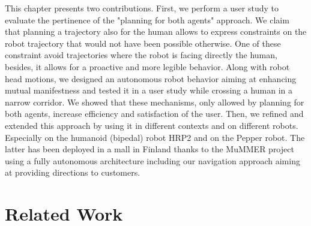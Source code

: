 \documentclass[a4paper,11pt,twoside]{StyleThese}
\begin{document}
This chapter presents two contributions. First, we perform a user study to evaluate the pertinence of the "planning for both agents" approach. We claim that planning a trajectory also for the human allows to express constraints on the robot trajectory that would not have been possible otherwise. One of these constraint avoid trajectories where the robot is facing directly the human, besides, it allows for a proactive and more legible behavior. Along with robot head motions, we designed an autonomous robot behavior aiming at enhancing mutual manifestness and tested it in a user study while crossing a human in a narrow corridor. We showed that these mechanisms, only allowed by planning for both agents, increase efficiency and satisfaction of the user.
Then, we refined and extended this approach by using it in different contexts and on different robots. Especially on the humanoid (bipedal) robot HRP2 and on the Pepper robot. The latter has been deployed in a mall in Finland thanks to the MuMMER project using a fully autonomous architecture including our navigation approach aiming at providing directions to customers.

\section{Related Work}
\end{document}
